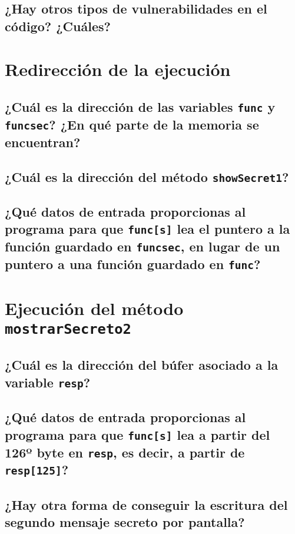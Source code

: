 \documentclass[10pt,a4paper]{article}
\begin{document}
\subsection{¿Hay otros tipos de vulnerabilidades en el código? ¿Cuáles?}


\section{Redirección de la ejecución}
\subsection{¿Cuál es la dirección de las variables \texttt{func} y \texttt{funcsec}? ¿En qué parte de la memoria se encuentran?}

\subsection{¿Cuál es la dirección del método \texttt{showSecret1}?}

\subsection{¿Qué datos de entrada proporcionas al programa para que \texttt{func[s]} lea el puntero a la función guardado en \texttt{funcsec}, en lugar de un puntero a una función guardado en \texttt{func}?}


\section{Ejecución del método \texttt{mostrarSecreto2}}
\subsection{¿Cuál es la dirección del búfer asociado a la variable \texttt{resp}?}

\subsection{¿Qué datos de entrada proporcionas al programa para que \texttt{func[s]} lea a partir del 126º byte en \texttt{resp}, es decir, a partir de \texttt{resp[125]}?}

\subsection{¿Hay otra forma de conseguir la escritura del segundo mensaje secreto por pantalla?}
\end{document}
